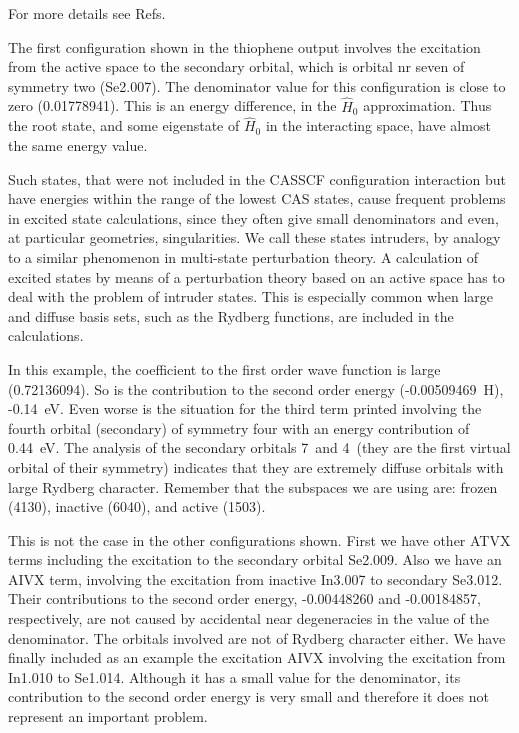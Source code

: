 For more details see Refs. \cite{Andersson:90,Andersson:92a,Andersson:92e}

The first configuration shown in the thiophene output involves the excitation
from the active space to the secondary orbital, which is orbital nr
seven of symmetry two (Se2.007). The denominator value for this
configuration is close to zero (0.01778941). This is an energy difference,
in the $\hat{H}_0$ approximation. Thus the root state, and some
eigenstate of $\hat{H}_0$ in the interacting space, have almost the same
energy value.

Such states, that were not included in the CASSCF configuration interaction
but have energies within the range of the lowest CAS states, cause frequent
problems in excited state calculations, since they often give
small denominators and even, at particular geometries, singularities. We
call these states intruders, by analogy to a similar phenomenon in multi-state
perturbation theory.
A calculation of excited states by means of a perturbation theory
based on an active space has to deal with the problem of intruder states.
This is especially common when large and diffuse basis
sets, such as the Rydberg functions, are included in the calculations.

In this example, the coefficient to the
first order wave function is large (0.72136094). So is
the contribution to the second order energy (-0.00509469~H),
-0.14~eV. Even worse is the situation for the third term printed
involving the fourth orbital (secondary) of symmetry four
with an energy contribution of 0.44~eV. The analysis of the secondary
orbitals 7\bo\ and 4\at\ (they are the first virtual orbital of their
symmetry) indicates that they are extremely diffuse orbitals with
large Rydberg character. Remember that the subspaces we are
using are: frozen (4130), inactive (6040), and active (1503).

This is not the case in the other configurations shown. First we
have other ATVX terms including the excitation to the secondary
orbital Se2.009. Also we have an AIVX term, involving
the excitation from inactive In3.007 to secondary Se3.012. Their
contributions to the second order energy, -0.00448260 and -0.00184857,
respectively, are not caused by accidental near degeneracies in the value of
the denominator. The orbitals involved are not of Rydberg character either.
We have finally included as an example the excitation AIVX involving
the excitation from In1.010 to Se1.014. Although it has a small value
for the denominator, its contribution to the second order energy is
very small and therefore it does not represent an important problem.

